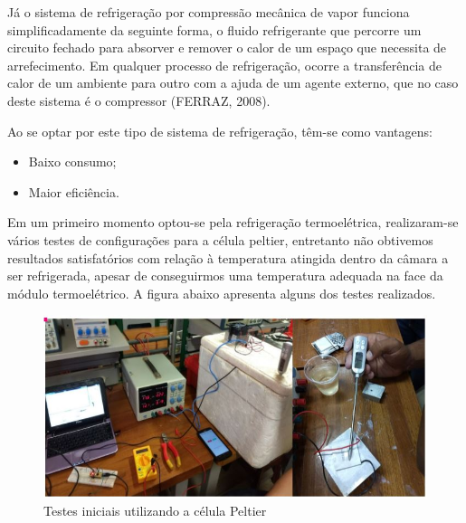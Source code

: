 	Já o sistema de refrigeração por compressão mecânica de vapor funciona simplificadamente da seguinte forma, o fluido refrigerante que percorre um circuito fechado para absorver e remover o calor de um espaço que necessita de arrefecimento. Em qualquer processo de refrigeração, ocorre a transferência de calor de um ambiente para outro com a ajuda de um agente externo, que no caso deste sistema é o compressor (FERRAZ, 2008).
	
	Ao se optar por este tipo de sistema de refrigeração, têm-se como vantagens:
	\begin{itemize}
		\item Baixo consumo;
		\item Maior eficiência.
	\end{itemize}

	Em um primeiro momento optou-se pela refrigeração termoelétrica, realizaram-se vários testes de configurações para a célula peltier, entretanto não obtivemos resultados satisfatórios com relação à temperatura atingida dentro da câmara a ser refrigerada, apesar de conseguirmos uma temperatura adequada na face da módulo termoelétrico. A figura abaixo apresenta alguns dos testes realizados.
	
	
	\begin{figure}[H]
		\begin{center}
			\includegraphics[scale = 0.8]{figuras/teste_Peltier.JPG}
			\caption{Testes iniciais utilizando a célula Peltier}
		\end{center}
	\end{figure}
	
